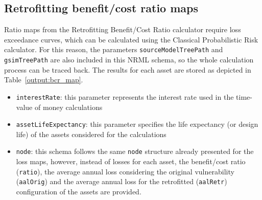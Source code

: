 \subsection{Retrofitting benefit/cost ratio maps}

Ratio maps from the Retrofitting Benefit/Cost Ratio calculator require loss
exceedance curves, which can be calculated using the Classical Probabilistic Risk
calculator. For this reason, the parameters \Verb+sourceModelTreePath+ and
\Verb+gsimTreePath+ are also included in this NRML schema, so the whole
calculation process can be traced back. The results for each \gls{asset} are
stored as depicted in Table~\ref{output:bcr_map}.




\begin{itemize}
  \item \Verb+interestRate+: this parameter represents the interest rate used
    in the time-value of money calculations

  \item \Verb+assetLifeExpectancy+: this parameter specifies the life expectancy
    (or design life) of the \glspl{asset} considered for the calculations

  \item \Verb+node+: this schema follows the same \Verb+node+ structure already
    presented for the loss maps, however, instead of losses for each
    \gls{asset}, the benefit/cost ratio (\Verb+ratio+), the average annual loss
    considering the original vulnerability (\Verb+aalOrig+) and the average
    annual loss for the retrofitted (\Verb+aalRetr+) configuration of the
    \glspl{asset} are provided.

\end{itemize}